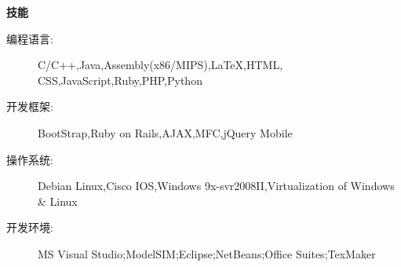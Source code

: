\documentclass[letterpaper,11pt]{article}
\newcommand{\resheading}[1]{{\large \colorbox{mygrey}{\begin{minipage}{\textwidth}{\textbf{#1 \vphantom{p\^{E}}}}\end{minipage}}}}
\begin{document}
\begin{CJK}{UTF8}{gbsn}
\resheading{技能}
	\begin{description}
		\item[编程语言:] { \footnotesize C/C++,Java,Assembly(x86/MIPS),LaTeX,HTML, CSS,JavaScript,Ruby,PHP,Python}
		\item[开发框架:] { \footnotesize BootStrap,Ruby on Rails,AJAX,MFC,jQuery Mobile}
		\item[操作系统:] { \footnotesize Debian Linux,Cisco IOS,Windows 9x-svr2008II,Virtualization of Windows \& Linux}
		\item[开发环境:]{\footnotesize {MS Visual Studio};{ModelSIM};{Eclipse};{NetBeans};{Office Suites};{TexMaker}}  
	\end{description} %
\end{CJK}
\end{document}
